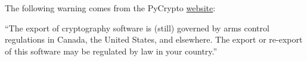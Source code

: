 \begin{warn}
The following warning comes from the PyCrypto \href{https://www.dlitz.net/software/pycrypto/}{website}:

``The export of cryptography software is (still) governed by arms control regulations in Canada, the United States, and elsewhere.
The export or re-export of this software may be regulated by law in your country.''
\end{warn}


\begin{comment}
\begin{problem}[Group Project]
Split into several groups of at least three individuals.
Each group member should generate a private and public keypair using PyCrypto.
Share your public keys with everyone in the group.

You might find it useful to transmit your messages as strings.
Here are two functions that will read and write specially formatted strings for your messages.
\begin{lstlisting}
def print_msg(m_encrypted):
    #print the encrypted message as a specially formatted string
    out = ("----BEGIN MESSAGE----",
           m_encrypted[0],
           "----END MESSAGE----",
           "----BEGIN SIGNATURE----",
           m_encrypted[1],
           "----END SIGNATURE----")
    return '\n'.join(out)

def read_msg(m_string):
    d1 = m_string.find('----BEGIN MESSAGE----') + 21
    d2 = m_string.find('----END MESSAGE----', d1)
    
    d3 = m_string.find('----BEGIN SIGNATURE----', d2) + 23
    d4 = m_string.find('----END SIGNATURE----', d3)
    message  = m_string[d1:d2]
    sign = m_string[d3:d4]
    return message.strip(), sign.strip()
\end{lstlisting}

\begin{enumerate}
\item Encrypt and sign a message for someone in the group and send it to the entire group.
Attach the sender's name to the encrypted message (a claim that the message came from a particular sender).
In this exercise we will verify that the actual origin of the message is indeed the claimed origin.
Each group member should do the following:
\begin{enumerate}
\item Decrypt and verify the message addressed for you.
\item Attempt to decrypt and verify message addressed for someone else in the group.
\item Report the message and verified signature.
\end{enumerate}


\end{comment}
